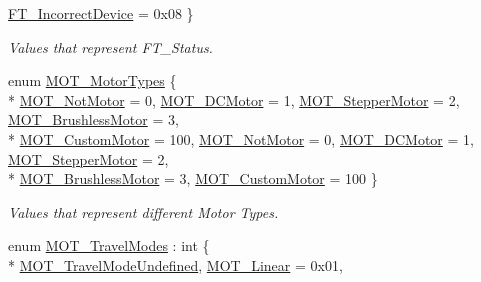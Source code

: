 \begin{DoxyCompactItemize}
\hyperlink{group___common_gga9de42f4b466f017bd6daf4e230259f63aca07e33d55138391799f473adeb00140}{F\+T\+\_\+\+Incorrect\+Device} = 0x08
 \}\begin{DoxyCompactList}\small\item\em Values that represent F\+T\+\_\+\+Status. \end{DoxyCompactList}
\item 
enum \hyperlink{group___common_gac8faf0d1045d287ba4c1013ab2cfffca}{M\+O\+T\+\_\+\+Motor\+Types} \{ \\*
\hyperlink{group___common_ggac8faf0d1045d287ba4c1013ab2cfffcaa3e5f356a974fbc8fc77aaee0c23e9823}{M\+O\+T\+\_\+\+Not\+Motor} = 0, 
\hyperlink{group___common_ggac8faf0d1045d287ba4c1013ab2cfffcaae809a2bdcfac7b65215843f2aea2086b}{M\+O\+T\+\_\+\+D\+C\+Motor} = 1, 
\hyperlink{group___common_ggac8faf0d1045d287ba4c1013ab2cfffcaa1bd60821ae7e83a8ba8a79d529c91c24}{M\+O\+T\+\_\+\+Stepper\+Motor} = 2, 
\hyperlink{group___common_ggac8faf0d1045d287ba4c1013ab2cfffcaafb1b86ae08192aaa9a7b267aed37773a}{M\+O\+T\+\_\+\+Brushless\+Motor} = 3, 
\\*
\hyperlink{group___common_ggac8faf0d1045d287ba4c1013ab2cfffcaa698b77fc6f67abd028d5f371dfca8eda}{M\+O\+T\+\_\+\+Custom\+Motor} = 100, 
\hyperlink{group___common_ggac8faf0d1045d287ba4c1013ab2cfffcaa3e5f356a974fbc8fc77aaee0c23e9823}{M\+O\+T\+\_\+\+Not\+Motor} = 0, 
\hyperlink{group___common_ggac8faf0d1045d287ba4c1013ab2cfffcaae809a2bdcfac7b65215843f2aea2086b}{M\+O\+T\+\_\+\+D\+C\+Motor} = 1, 
\hyperlink{group___common_ggac8faf0d1045d287ba4c1013ab2cfffcaa1bd60821ae7e83a8ba8a79d529c91c24}{M\+O\+T\+\_\+\+Stepper\+Motor} = 2, 
\\*
\hyperlink{group___common_ggac8faf0d1045d287ba4c1013ab2cfffcaafb1b86ae08192aaa9a7b267aed37773a}{M\+O\+T\+\_\+\+Brushless\+Motor} = 3, 
\hyperlink{group___common_ggac8faf0d1045d287ba4c1013ab2cfffcaa698b77fc6f67abd028d5f371dfca8eda}{M\+O\+T\+\_\+\+Custom\+Motor} = 100
 \}\begin{DoxyCompactList}\small\item\em Values that represent different Motor Types. \end{DoxyCompactList}
\item 
enum \hyperlink{group___common_ga6ba6123918e8f35d6fef7daf9dbd11d4}{M\+O\+T\+\_\+\+Travel\+Modes} \+: int \{ \\*
\hyperlink{group___common_gga6ba6123918e8f35d6fef7daf9dbd11d4abbde058aa7397580f982fce0c6dbde78}{M\+O\+T\+\_\+\+Travel\+Mode\+Undefined}, 
\hyperlink{group___common_gga6ba6123918e8f35d6fef7daf9dbd11d4a51e3be0b3b203122cc8860458ab2f2ca}{M\+O\+T\+\_\+\+Linear} = 0x01, 

\end{DoxyCompactItemize}
